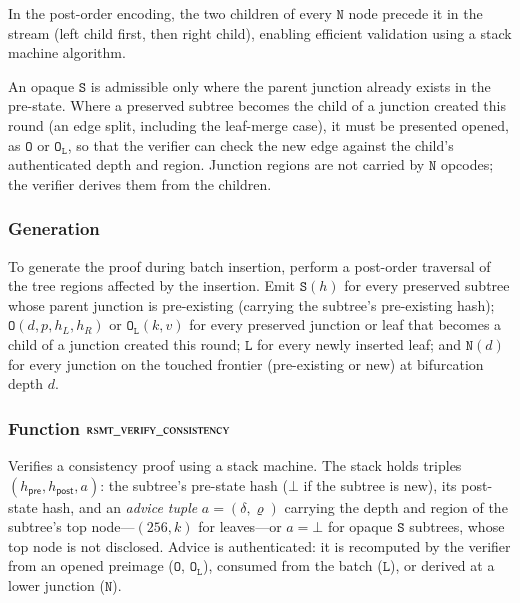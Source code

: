 \noindent In the post-order encoding, the two children of every $\mathtt{N}$ node precede it in the stream (left child first, then right child), enabling efficient validation using a stack machine algorithm.

An opaque $\mathtt{S}$ is admissible only where the parent junction already exists in the pre-state. Where a preserved subtree becomes the child of a junction created this round (an edge split, including the leaf-merge case), it must be presented opened, as $\mathtt{O}$ or $\mathtt{O_L}$, so that the verifier can check the new edge against the child's authenticated depth and region. Junction regions are not carried by $\mathtt{N}$ opcodes; the verifier derives them from the children.

\subsubsection{Generation}

To generate the proof during batch insertion, perform a post-order traversal of the tree regions affected by the insertion. Emit $\mathtt{S}(h)$ for every preserved subtree whose parent junction is pre-existing (carrying the subtree's pre-existing hash); $\mathtt{O}(d, p, h_L, h_R)$ or $\mathtt{O_L}(k, v)$ for every preserved junction or leaf that becomes a child of a junction created this round; $\mathtt{L}$ for every newly inserted leaf; and $\mathtt{N}(d)$ for every junction on the touched frontier (pre-existing or new) at bifurcation depth $d$.


\subsubsection{Function $\textsc{rsmt\_verify\_consistency}$}\label{sec:rsmt-verify-consistency}

Verifies a consistency proof using a stack machine. The stack holds triples $(h_\mathsf{pre}, h_\mathsf{post}, a)$: the subtree's pre-state hash ($\bot$ if the subtree is new), its post-state hash, and an \emph{advice tuple} $a = (\delta, \varrho)$ carrying the depth and region of the subtree's top node---$(256, k)$ for leaves---or $a = \bot$ for opaque $\mathtt{S}$ subtrees, whose top node is not disclosed. Advice is authenticated: it is recomputed by the verifier from an opened preimage ($\mathtt{O}$, $\mathtt{O_L}$), consumed from the batch ($\mathtt{L}$), or derived at a lower junction ($\mathtt{N}$).

